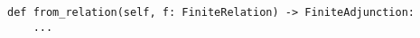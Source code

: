\begin{verbatim}
def from_relation(self, f: FiniteRelation) -> FiniteAdjunction:
    ...
\end{verbatim}